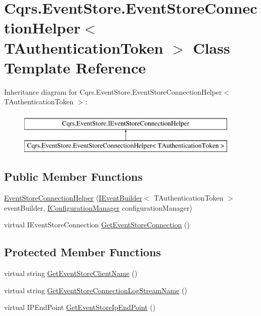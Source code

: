 \hypertarget{classCqrs_1_1EventStore_1_1EventStoreConnectionHelper}{}\section{Cqrs.\+Event\+Store.\+Event\+Store\+Connection\+Helper$<$ T\+Authentication\+Token $>$ Class Template Reference}
\label{classCqrs_1_1EventStore_1_1EventStoreConnectionHelper}
Inheritance diagram for Cqrs.\+Event\+Store.\+Event\+Store\+Connection\+Helper$<$ T\+Authentication\+Token $>$\+:\begin{figure}[H]
\begin{center}
\leavevmode
\includegraphics[height=2.000000cm]{classCqrs_1_1EventStore_1_1EventStoreConnectionHelper}
\end{center}
\end{figure}
\subsection*{Public Member Functions}
\begin{DoxyCompactItemize}
\item 
\hyperlink{classCqrs_1_1EventStore_1_1EventStoreConnectionHelper_ac9d232e255275c70aee4465b08e7fd79}{Event\+Store\+Connection\+Helper} (\hyperlink{interfaceCqrs_1_1EventStore_1_1IEventBuilder}{I\+Event\+Builder}$<$ T\+Authentication\+Token $>$ event\+Builder, \hyperlink{interfaceCqrs_1_1Configuration_1_1IConfigurationManager}{I\+Configuration\+Manager} configuration\+Manager)
\item 
virtual I\+Event\+Store\+Connection \hyperlink{classCqrs_1_1EventStore_1_1EventStoreConnectionHelper_a36c7ef0505319af9f8ae02da0050ab30}{Get\+Event\+Store\+Connection} ()
\end{DoxyCompactItemize}
\subsection*{Protected Member Functions}
\begin{DoxyCompactItemize}
\item 
virtual string \hyperlink{classCqrs_1_1EventStore_1_1EventStoreConnectionHelper_af2520736a2fb83c8b4b03e3581980c75}{Get\+Event\+Store\+Client\+Name} ()
\item 
virtual string \hyperlink{classCqrs_1_1EventStore_1_1EventStoreConnectionHelper_a8c018b324a38ce67ab73e637b1aa7bec}{Get\+Event\+Store\+Connection\+Log\+Stream\+Name} ()
\item 
virtual I\+P\+End\+Point \hyperlink{classCqrs_1_1EventStore_1_1EventStoreConnectionHelper_af0cdad325bbb3b3b45fe427028a322aa}{Get\+Event\+Store\+Ip\+End\+Point} ()
\end{DoxyCompactItemize}
